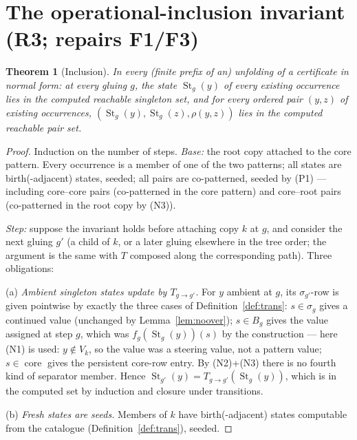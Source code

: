 \documentclass[11pt]{article}
\newtheorem{theorem}{Theorem}[section]
\theoremstyle{definition}
\newcommand{\St}{\operatorname{St}}
\newcommand{\core}{\operatorname{core}}
\begin{document}
\section{The operational-inclusion invariant (R3; repairs F1/F3)}
\label{sec:incl}

\begin{theorem}[Inclusion]\label{thm:incl}
In every (finite prefix of an) unfolding of a certificate in normal
form: at every gluing $g$, the state $\St_g(y)$ of every existing
occurrence lies in the computed reachable singleton set, and for every
ordered pair $(y,z)$ of existing occurrences,
$(\St_g(y),\St_g(z),\rho(y,z))$ lies in the computed reachable pair
set.
\end{theorem}

\begin{proof}
Induction on the number of steps.  \emph{Base:} the root copy attached
to the core pattern.  Every occurrence is a member of one of the two
patterns; all states are birth(-adjacent) states, seeded; all pairs are
co-patterned, seeded by (P1) --- including core--core pairs (co-patterned
in the core pattern) and core--root pairs (co-patterned in the root
copy by (N3)).

\emph{Step:} suppose the invariant holds before attaching copy $k$ at
$g$, and consider the next gluing $g'$ (a child of $k$, or a later
gluing elsewhere in the tree order; the argument is the same with
$T$ composed along the corresponding path).  Three obligations:

(a) \emph{Ambient singleton states update by $T_{g\to g'}$.}  For $y$
ambient at $g$, its $\sigma_{g'}$-row is given pointwise by exactly the
three cases of Definition~\ref{def:trans}: $s\in\sigma_g$ gives a
continued value (unchanged by Lemma~\ref{lem:noover}); $s\in B_g$ gives
the value assigned at step $g$, which was $f_g(\St_g(y))(s)$ by the
construction --- here (N1) is used: $y\notin V_k$, so the value was a
steering value, not a pattern value; $s\in\core$ gives the persistent
core-row entry.  By (N2)+(N3) there is no fourth kind of separator
member.  Hence $\St_{g'}(y)=T_{g\to g'}(\St_g(y))$, which is in the
computed set by induction and closure under transitions.

(b) \emph{Fresh states are seeds.}  Members of $k$ have
birth(-adjacent) states computable from the catalogue
(Definition~\ref{def:trans}), seeded.


\end{proof}
\end{document}

